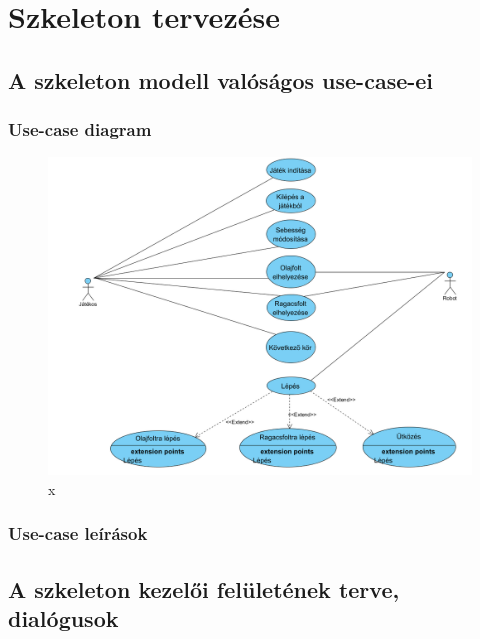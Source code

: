 %
\chapter{Szkeleton tervezése}

\thispagestyle{fancy}

\section{A szkeleton modell valóságos use-case-ei}

\subsection{Use-case diagram}

\begin{figure}[h]
\begin{center}
\includegraphics[width=17cm]{chapters/chapter05/use_case.png}
\caption{x}
\label{fig:SzkeletonUseCase}
\end{center}
\end{figure}

\subsection{Use-case leírások}




\section{A szkeleton kezelői felületének terve, dialógusok}

